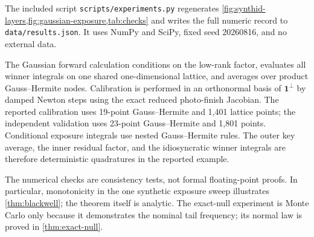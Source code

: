 \documentclass[11pt]{article}
\theoremstyle{definition}
\theoremstyle{remark}
\newcommand{\one}{\mathbf{1}}
\begin{document}
The included script \texttt{scripts/experiments.py} regenerates \cref{fig:synthid-layers,fig:gaussian-exposure,tab:checks} and writes the full numeric record to \texttt{data/results.json}. It uses NumPy and SciPy, fixed seed 20260816, and no external data.

The Gaussian forward calculation conditions on the low-rank factor, evaluates all winner integrals on one shared one-dimensional lattice, and averages over product Gauss--Hermite nodes. Calibration is performed in an orthonormal basis of $\one^\perp$ by damped Newton steps using the exact reduced photo-finish Jacobian. The reported calibration uses 19-point Gauss--Hermite and 1,401 lattice points; the independent validation uses 23-point Gauss--Hermite and 1,801 points. Conditional exposure integrals use nested Gauss--Hermite rules. The outer key average, the inner residual factor, and the idiosyncratic winner integrals are therefore deterministic quadratures in the reported example.

The numerical checks are consistency tests, not formal floating-point proofs. In particular, monotonicity in the one synthetic exposure sweep illustrates \cref{thm:blackwell}; the theorem itself is analytic. The exact-null experiment is Monte Carlo only because it demonstrates the nominal tail frequency; its normal law is proved in \cref{thm:exact-null}.



\end{document}
